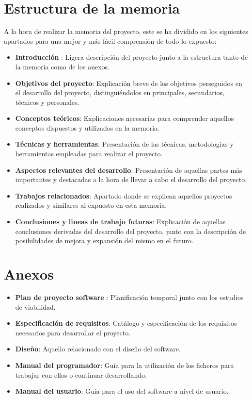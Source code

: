 \section{Estructura de la memoria}
A la hora de realizar la memoria del proyecto, este se ha dividido en los siguientes apartados para una mejor y más fácil comprensión de todo lo expuesto:
\begin{itemize}
\item \textbf{Introducción} : Ligera descripción del proyecto junto a la estructura tanto de la memoria como de los anexos.
\item \textbf{Objetivos del proyecto}: Explicación breve de los objetivos perseguidos en el desarrollo del proyecto, distinguiéndolos en principales, secundarios, técnicos y personales. 
\item \textbf{Conceptos teóricos}: Explicaciones necesarias para comprender aquellos conceptos dispuestos y utilizados en la memoria.
\item \textbf{Técnicas y herramientas}: Presentación de las técnicas, metodologías y herramientas empleadas para realizar el proyecto.
\item \textbf{Aspectos relevantes del desarrollo}: Presentación de aquellas partes más importantes y destacadas a la hora de llevar a cabo el desarrollo del proyecto.
\item \textbf{Trabajos relacionados}: Apartado donde se explican aquellos proyectos realizados y similares al expuesto en esta memoria.
\item \textbf{Conclusiones y lineas de trabajo futuras}: Explicación de aquellas conclusiones derivadas del desarrollo del proyecto, junto con la descripción de posibilidades de mejora y expansión del mismo en el futuro.
\end{itemize}


\section{Anexos}
\begin{itemize}
    \item \textbf{Plan de proyecto software} : Planificación temporal junto con los estudios de viabilidad.
    \item \textbf{Especificación de requisitos}:  Catálogo y especificación de los requisitos necesarios para desarrollar el proyecto. 
    \item \textbf{Diseño}: Aquello relacionado con el diseño del software.
    \item \textbf{Manual del programador}: Guía para la utilización de los ficheros para trabajar con ellos o continuar desarrollando.
    \item \textbf{Manual del usuario}: Guía para el uso del software a nivel de usuario.
\end{itemize}

